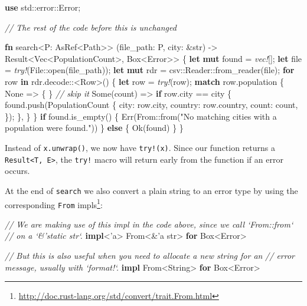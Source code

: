\documentclass[a4paper,]{book}
\newenvironment{Shaded}{\begin{snugshade}}{\end{snugshade}}
\newcommand{\KeywordTok}[1]{\textcolor[rgb]{0.13,0.29,0.53}{\textbf{{#1}}}}
\newcommand{\DataTypeTok}[1]{\textcolor[rgb]{0.13,0.29,0.53}{{#1}}}
\newcommand{\ConstantTok}[1]{\textcolor[rgb]{0.00,0.00,0.00}{{#1}}}
\newcommand{\StringTok}[1]{\textcolor[rgb]{0.31,0.60,0.02}{{#1}}}
\newcommand{\CommentTok}[1]{\textcolor[rgb]{0.56,0.35,0.01}{\textit{{#1}}}}
\newcommand{\OtherTok}[1]{\textcolor[rgb]{0.56,0.35,0.01}{{#1}}}
\newcommand{\PreprocessorTok}[1]{\textcolor[rgb]{0.56,0.35,0.01}{\textit{{#1}}}}
\newcommand{\NormalTok}[1]{{#1}}
\renewcommand{\href}[2]{#2\footnote{\url{#1}}}
\begin{document}
\begin{Shaded}
\begin{Highlighting}[]
\KeywordTok{use} \NormalTok{std::error::Error;}

\CommentTok{// The rest of the code before this is unchanged}

\KeywordTok{fn} \NormalTok{search<P: AsRef<Path>>}
         \NormalTok{(file_path: P, city: &}\DataTypeTok{str}\NormalTok{)}
         \NormalTok{-> }\DataTypeTok{Result}\NormalTok{<}\DataTypeTok{Vec}\NormalTok{<PopulationCount>, }\DataTypeTok{Box}\NormalTok{<Error>> \{}
    \KeywordTok{let} \KeywordTok{mut} \NormalTok{found = }\PreprocessorTok{vec!}\NormalTok{[];}
    \KeywordTok{let} \NormalTok{file = }\PreprocessorTok{try!}\NormalTok{(File::open(file_path));}
    \KeywordTok{let} \KeywordTok{mut} \NormalTok{rdr = csv::Reader::from_reader(file);}
    \KeywordTok{for} \NormalTok{row }\KeywordTok{in} \NormalTok{rdr.decode::<Row>() \{}
        \KeywordTok{let} \NormalTok{row = }\PreprocessorTok{try!}\NormalTok{(row);}
        \KeywordTok{match} \NormalTok{row.population \{}
            \ConstantTok{None} \NormalTok{=> \{ \} }\CommentTok{// skip it}
            \ConstantTok{Some}\NormalTok{(count) => }\KeywordTok{if} \NormalTok{row.city == city \{}
                \NormalTok{found.push(PopulationCount \{}
                    \NormalTok{city: row.city,}
                    \NormalTok{country: row.country,}
                    \NormalTok{count: count,}
                \NormalTok{\});}
            \NormalTok{\},}
        \NormalTok{\}}
    \NormalTok{\}}
    \KeywordTok{if} \NormalTok{found.is_empty() \{}
        \ConstantTok{Err}\NormalTok{(From::from(}\StringTok{"No matching cities with a population were found."}\NormalTok{))}
    \NormalTok{\} }\KeywordTok{else} \NormalTok{\{}
        \ConstantTok{Ok}\NormalTok{(found)}
    \NormalTok{\}}
\NormalTok{\}}
\end{Highlighting}
\end{Shaded}

Instead of \texttt{x.unwrap()}, we now have \texttt{try!(x)}. Since our
function returns a \texttt{Result\textless{}T,\ E\textgreater{}}, the
\texttt{try!} macro will return early from the function if an error
occurs.

At the end of \texttt{search} we also convert a plain string to an error
type by using the
\href{http://doc.rust-lang.org/std/convert/trait.From.html}{corresponding
\texttt{From} impls}:

\begin{Shaded}
\begin{Highlighting}[]
\CommentTok{// We are making use of this impl in the code above, since we call `From::from`}
\CommentTok{// on a `&'static str`.}
\KeywordTok{impl}\NormalTok{<}\OtherTok{'a}\NormalTok{> From<&}\OtherTok{'a} \DataTypeTok{str}\NormalTok{> }\KeywordTok{for} \DataTypeTok{Box}\NormalTok{<Error>}

\CommentTok{// But this is also useful when you need to allocate a new string for an}
\CommentTok{// error message, usually with `format!`.}
\KeywordTok{impl} \NormalTok{From<}\DataTypeTok{String}\NormalTok{> }\KeywordTok{for} \DataTypeTok{Box}\NormalTok{<Error>}
\end{Highlighting}
\end{Shaded}
\end{document}
